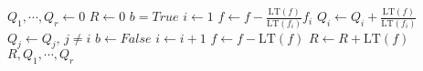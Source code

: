             \begin{algorithm}
                \begin{algorithmic}
                        \State $Q_1, \cdots, Q_r \gets 0$
                        \State $R \gets 0$
                            \State $b = True$
                            \State $i \gets 1$
                                    \State $f \gets f - \frac{\mathrm{LT}(f)}{\mathrm{LT}(f_i)} f_i$
                                    \State $Q_i \gets Q_i + \frac{\mathrm{LT}(f)}{\mathrm{LT}(f_i)}$
                                    \State $Q_j \gets Q_j,\, j \neq i$
                                    \State $b \gets False$
                                \EndIf
                                \State $i \gets i + 1$
                            \EndWhile
                                \State $f \leftarrow f - \mathrm{LT}(f)$
                                \State $R \leftarrow R + \mathrm{LT}(f)$
                            \EndIf
                        \EndWhile
                        \State \Return $R,Q_1, \cdots, Q_r$
                    \EndFunction
                \end{algorithmic}
            \end{algorithm}

